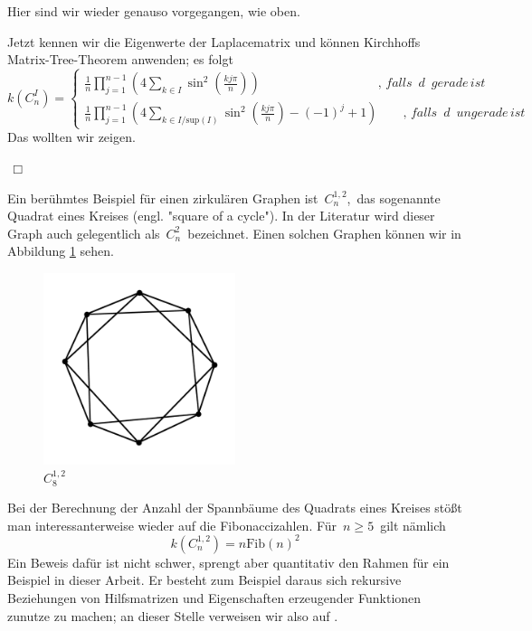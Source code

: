 \normalsize
Hier sind wir wieder genauso vorgegangen, wie oben.\\
\par
\endgroup
Jetzt kennen wir die Eigenwerte der Laplacematrix und können Kirchhoffs Matrix-Tree-Theorem anwenden; es folgt
\begin{equation}
\mathit{k}\left( C_n^I \right) = 
 \begin{cases}
\frac{1}{n} \prod_{j=1}^{n-1} \left(4 \sum_{k \in I} \sin^2 \left( \frac{kj\pi}{n}\right) \right)\qquad\qquad\qquad\qquad\quad\; ,\,falls\,\,\,d\,\,\,gerade\,ist\\
\frac{1}{n} \prod_{j=1}^{n-1} \left(4 \sum_{k \in I/\mathrm{sup}(I)} \sin^2 \left( \frac{kj\pi}{n}\right)-(-1)^j+1\right)\qquad,\,falls\,\,\,d\,\,\,ungerade\,ist
\end{cases}
\end{equation}
Das wollten wir zeigen.
\begin{flushright} $\,\Box\,$ \end{flushright} 
\begin{Bsps}
\end{Bsps}
Ein berühmtes Beispiel für einen zirkulären Graphen ist $\,C_n^{1,2}$,\, das sogenannte Quadrat eines Kreises (engl. "square of a cycle"). In der Literatur wird dieser Graph auch gelegentlich als $\,C_n^2\,$ bezeichnet. Einen solchen Graphen können wir in Abbildung \ref{c2_8} sehen.
\begin{figure}[H]
  \centering
 \includegraphics[width=0.5\textwidth]{c2_8.png}
 \caption{$C_8^{1,2}$}
 \label{c2_8} %
\end{figure}
Bei der Berechnung der Anzahl der Spannbäume des Quadrats eines Kreises stößt man interessanterweise wieder auf die Fibonaccizahlen. Für $\,n\geq5\,$ gilt nämlich
\begin{equation}
 \mathit{k}\left(C_n^{1,2}\right)=n\mathrm{Fib}(n)^2
\end{equation}
Ein Beweis dafür ist nicht schwer, sprengt aber quantitativ den Rahmen für ein Beispiel in dieser Arbeit. Er besteht zum Beispiel daraus sich rekursive Beziehungen von Hilfsmatrizen und Eigenschaften erzeugender Funktionen zunutze zu machen; an dieser Stelle verweisen wir also auf \cite{wang_yang_1984}.

